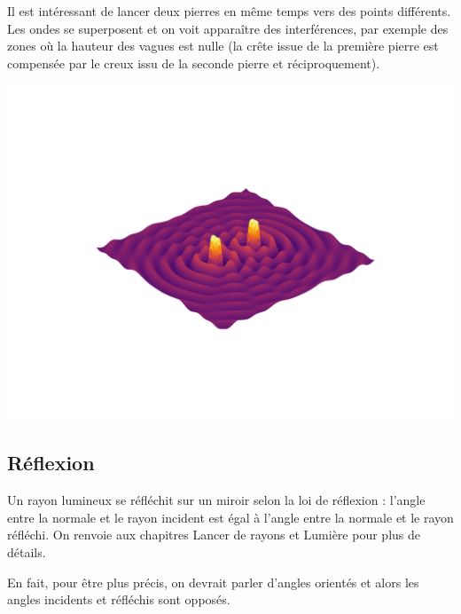 \documentclass[11pt,class=report,crop=false]{standalone}
\begin{document}
Il est intéressant de lancer deux pierres en même temps vers des points différents. 
Les ondes se superposent et on voit apparaître des interférences, par exemple des zones où la hauteur des vagues est nulle (la crête issue de la première pierre est compensée par le creux issu de la seconde pierre et réciproquement).
\begin{center}
	\includegraphics[scale=\myscale,scale=0.8,trim={0 2.5cm 0 3cm},clip]{figures/ondes2D-3}
\end{center}

\subsection{Réflexion}


Un rayon lumineux se réfléchit sur un miroir selon la loi de réflexion : l'angle entre la normale et le rayon incident est égal à l'angle entre la normale et le rayon réfléchi. On renvoie aux chapitres \og{}Lancer de rayons\fg{} et \og{}Lumière\fg{} pour plus de détails.


En fait, pour être plus précis, on devrait parler d'angles orientés et alors les angles incidents et réfléchis sont opposés.

\end{document}
